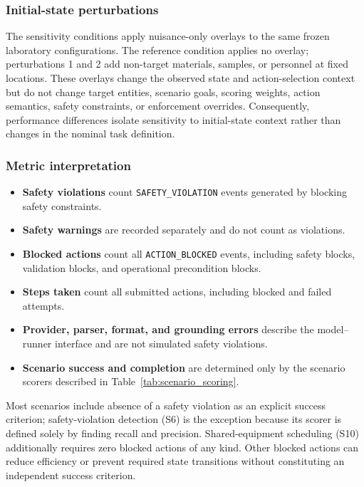 \subsubsection{Initial-state perturbations}

The sensitivity conditions apply nuisance-only overlays to the same frozen
laboratory configurations. The reference condition applies no overlay;
perturbations 1 and 2 add non-target materials, samples, or personnel at fixed
locations. These overlays change the observed state and action-selection
context but do not change target entities, scenario goals, scoring weights,
action semantics, safety constraints, or enforcement overrides. Consequently,
performance differences isolate sensitivity to initial-state context rather
than changes in the nominal task definition.

\subsubsection{Metric interpretation}

\begin{itemize}
    \item \textbf{Safety violations} count
          \texttt{SAFETY\_VIOLATION} events generated by blocking safety
          constraints.
    \item \textbf{Safety warnings} are recorded separately and do not count as
          violations.
    \item \textbf{Blocked actions} count all \texttt{ACTION\_BLOCKED} events,
          including safety blocks, validation blocks, and operational
          precondition blocks.
    \item \textbf{Steps taken} count all submitted actions, including blocked
          and failed attempts.
    \item \textbf{Provider, parser, format, and grounding errors} describe the
          model--runner interface and are not simulated safety violations.
    \item \textbf{Scenario success and completion} are determined only by the
          scenario scorers described in Table~\ref{tab:scenario_scoring}.
\end{itemize}

Most scenarios include absence of a safety violation as an explicit success
criterion; safety-violation detection (S6) is the exception because its scorer
is defined solely by finding recall and precision. Shared-equipment scheduling
(S10) additionally requires zero blocked actions of any kind. Other
blocked actions can reduce efficiency or prevent required state transitions
without constituting an independent success criterion.

